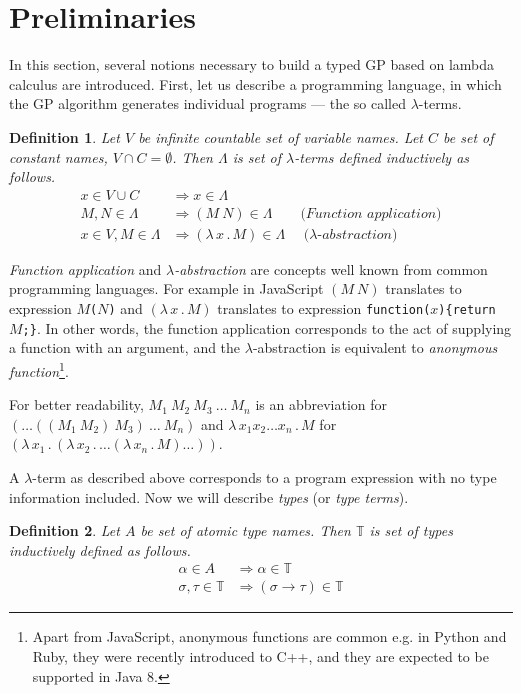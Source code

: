 \documentclass{sig-alternate}
\newtheorem{definition}{Definition}
\newcommand{\lets}{let us\xspace}
\newcommand{\lterm}{$\lambda$-term\xspace}
\newcommand{\lterms}{$\lambda$-terms\xspace}
\newcommand{\then}{\Rightarrow\xspace}
\newcommand{\lamb}[2]{( \lambda \, #1 \, . \, #2 )}
\newcommand{\lam}[2]{\lambda \, #1 \, . \, #2}
\newcommand{\ar}{\rightarrow\xspace}
\newcommand{\T}{\mathbb{T}\xspace}
\begin{document}
\section{Preliminaries}
\label{preliminaries}

In this section, several notions necessary to build a typed GP based on lambda calculus are introduced. 
First, \lets describe a programming language, 
in which the GP algorithm generates individual programs --- the so called \lterms.

\begin{definition}
Let $V$ be infinite countable set of {\it 
variable names}. Let $C$ be set of {\it constant names}, 
$V \cap C = \emptyset$.	 	
Then $\Lambda$ is set of {\it \lterms} defined inductively as follows.	
\begin{align*}
x   \in V \cup C  &\then x     \in \Lambda \\
M,N \in \Lambda   &\then (M~N) \in \Lambda 
\textit{~~~~~~(Function application)} \\
x   \in V , M \in \Lambda &\then \lamb{x}{M} \in \Lambda
\textit{~~~~($\lambda$-abstraction)} 
\end{align*}
\end{definition}


\textit{Function application} and 
\textit{$\lambda$-abstraction} are concepts
well known from common programming languages. 
For example in JavaScript 
$(M~N)$ translates to expression \texttt{$M$($N$)} and
$\lamb{x}{M}$ translates to expression \texttt{function($x$)\{return $M$;\}}.
In other words, the function application 
corresponds to the act of supplying a function 
with an argument, and
the $\lambda$-abstraction is equivalent to 
\textit{anonymous function}\footnote{Apart from JavaScript, anonymous functions are common e.g. in Python and Ruby, 
they were recently introduced to C++, and they are expected to be supported in Java 8.}.

For better readability, 
$M_1~M_2~M_3~\dots~M_n$ is an abbreviation for
$(\dots((M_1~M_2)~M_3)~\dots~M_n)$
and $\lam{x_1 x_2 \dots x_n }{M}$ for 
$\lamb{x_1}{\lamb{x_2}{\dots\lamb{x_n}{M}\dots}}$.

A \lterm as described above
corresponds to a program expression with no type information
included. Now we will describe \textit{types} (or \textit{type terms}).

\begin{definition}
Let $A$ be set of {\it atomic type names}. 
Then $\mathbb{T}$ is set of {\it types} inductively defined as follows.
\begin{align*}
\alpha      \in A  &\then   \alpha \in \T \\
\sigma,\tau \in \T &\then ( \sigma \ar  \tau ) \in \T 
\end{align*}
\end{definition}
\end{document}
